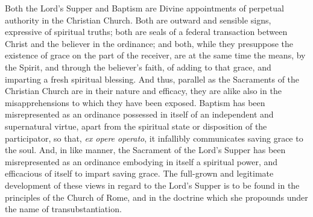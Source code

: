 \documentclass[english,]{book}
\begin{document}
Both the Lord's Supper and Baptism are Divine appointments of perpetual authority in the Christian Church. Both are outward and sensible signs, expressive of spiritual truths; both are seals of a federal transaction between Christ and the believer in the ordinance; and both, while they presuppose the existence of grace on the part of the receiver, are at the same time the means, by the Spirit, and through the believer's faith, of adding to that grace, and imparting a fresh spiritual blessing. And thus, parallel as the Sacraments of the Christian Church are in their nature and efficacy, they are alike also in the misapprehensions to which they have been exposed. Baptism has been misrepresented as an ordinance possessed in itself of an independent and supernatural virtue, apart from the spiritual state or disposition of the participator, so that, \emph{ex opere operato}, it infallibly communicates saving grace to the soul. And, in like manner, the Sacrament of the Lord's Supper has been misrepresented as an ordinance embodying in itself a spiritual power, and efficacious of itself to impart saving grace. The full-grown and legitimate development of these views in regard to the Lord's Supper is to be found in the principles of the Church of Rome, and in the doctrine which she propounds under the name of transubstantiation.
\end{document}
